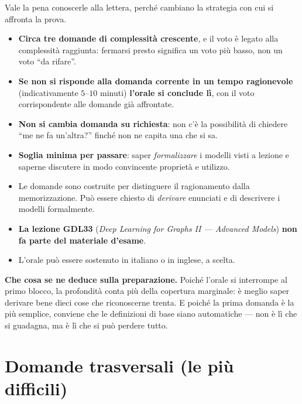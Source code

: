 \begin{tcolorbox}[mywarn, title={Regole dell'orale, dalle slide GDL35 (verbatim, tradotto)}]
Vale la pena conoscerle alla lettera, perché cambiano la strategia con cui si affronta la prova.

\begin{itemize}[leftmargin=1.4em]
  \item \textbf{Circa tre domande di complessità crescente}, e il voto è legato alla complessità raggiunta: fermarsi presto significa un voto più basso, non un voto ``da rifare''.
  \item \textbf{Se non si risponde alla domanda corrente in un tempo ragionevole} (indicativamente $5$--$10$ minuti) \textbf{l'orale si conclude lì}, con il voto corrispondente alle domande già affrontate.
  \item \textbf{Non si cambia domanda su richiesta}: non c'è la possibilità di chiedere ``me ne fa un'altra?'' finché non ne capita una che si sa.
  \item \textbf{Soglia minima per passare}: saper \emph{formalizzare} i modelli visti a lezione e saperne discutere in modo convincente proprietà e utilizzo.
  \item Le domande sono costruite per distinguere il ragionamento dalla memorizzazione. Può essere chiesto di \emph{derivare} enunciati e di descrivere i modelli formalmente.
  \item \textbf{La lezione GDL33} (\emph{Deep Learning for Graphs II — Advanced Models}) \textbf{non fa parte del materiale d'esame}.
  \item L'orale può essere sostenuto in italiano o in inglese, a scelta.
\end{itemize}

\medskip
\textbf{Che cosa se ne deduce sulla preparazione.} Poiché l'orale si interrompe al primo blocco, la profondità conta più della copertura marginale: è meglio saper derivare bene dieci cose che riconoscerne trenta. E poiché la prima domanda è la più semplice, conviene che le definizioni di base siano automatiche — non è lì che si guadagna, ma è lì che si può perdere tutto.
\end{tcolorbox}

\section{Domande trasversali (le più difficili)}

